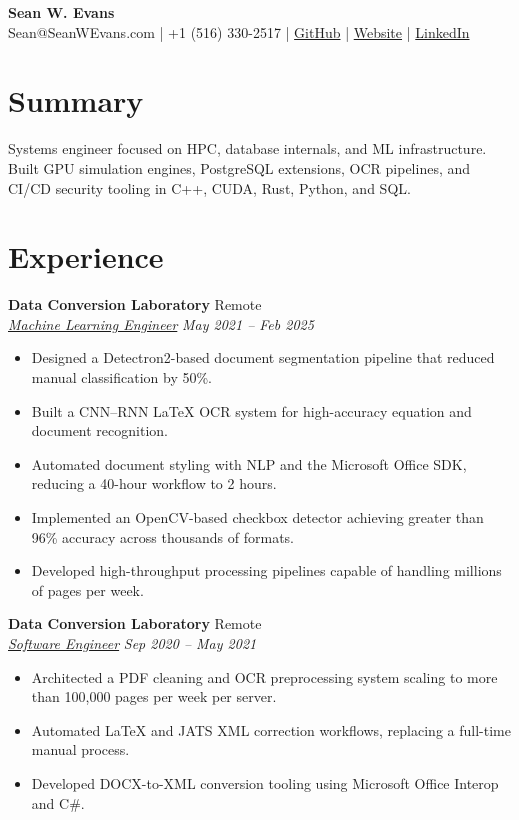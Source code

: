 \documentclass[10pt,letterpaper]{article}
\newcommand{\resumeSubheading}[4]{%
  \textbf{#1} \hfill #2\\
  \underline{\textit{#3}} \hfill \textit{#4}\\
  \vspace{-1em}
}
\begin{document}
{\LARGE \textbf{Sean W. Evans}}\\
Sean@SeanWEvans.com | +1 (516) 330-2517 |
\href{https://github.com/SeanWEvans}{GitHub} |
\href{https://SeanWEvans.com}{Website} |
\href{https://www.linkedin.com/in/sean-evans-49398229b/}{LinkedIn}

\section{Summary}
Systems engineer focused on HPC, database internals, and ML infrastructure. Built GPU simulation engines, PostgreSQL extensions, OCR pipelines, and CI/CD security tooling in C++, CUDA, Rust, Python, and SQL.

\section{Experience}

\resumeSubheading{Data Conversion Laboratory}{Remote}{Machine Learning Engineer}{May 2021 -- Feb 2025}
\begin{itemize}
  \item Designed a Detectron2-based document segmentation pipeline that reduced manual classification by 50\%.
  \item Built a CNN--RNN LaTeX OCR system for high-accuracy equation and document recognition.
  \item Automated document styling with NLP and the Microsoft Office SDK, reducing a 40-hour workflow to 2 hours.
  \item Implemented an OpenCV-based checkbox detector achieving greater than 96\% accuracy across thousands of formats.
  \item Developed high-throughput processing pipelines capable of handling millions of pages per week.
\end{itemize}

\resumeSubheading{Data Conversion Laboratory}{Remote}{Software Engineer}{Sep 2020 -- May 2021}
\begin{itemize}
  \item Architected a PDF cleaning and OCR preprocessing system scaling to more than 100{,}000 pages per week per server.
  \item Automated LaTeX and JATS XML correction workflows, replacing a full-time manual process.
  \item Developed DOCX-to-XML conversion tooling using Microsoft Office Interop and C\#.
\end{itemize}
\end{document}
